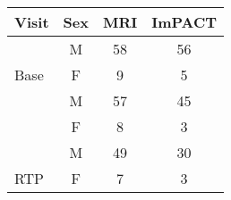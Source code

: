 
\begin{tabular}{lccc}
Visit & \multicolumn{1}{l}{Sex} & \multicolumn{1}{l}{MRI} & \multicolumn{1}{l}{ImPACT} \\ \hline
 & M & 58 & 56 \\
\multirow{-2}{*}{Base} & \cellcolor[HTML]{C0C0C0}F & \cellcolor[HTML]{C0C0C0}9 & \cellcolor[HTML]{C0C0C0}5 \\
\rowcolor[HTML]{EFEFEF}
\cellcolor[HTML]{EFEFEF} & M & 57 & 45 \\
\rowcolor[HTML]{C0C0C0}
\multirow{-2}{*}{\cellcolor[HTML]{EFEFEF}Post} & {\color[HTML]{333333} F} & {\color[HTML]{333333} 8} & {\color[HTML]{333333} 3} \\
 & M & 49 & 30 \\
\multirow{-2}{*}{RTP} & \cellcolor[HTML]{C0C0C0}F & \cellcolor[HTML]{C0C0C0}7 & \cellcolor[HTML]{C0C0C0}3
\end{tabular}
